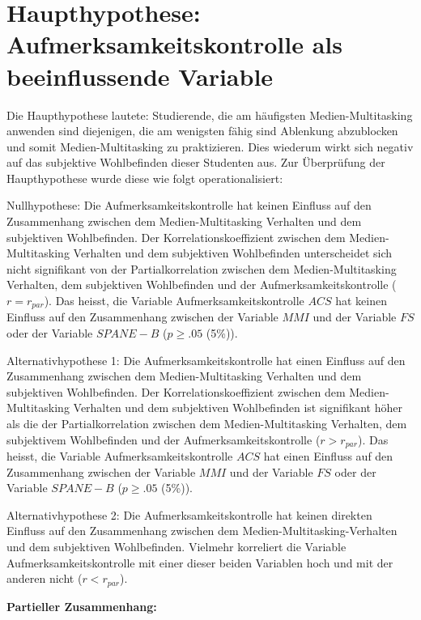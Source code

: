 \section{Haupthypothese: Aufmerksamkeitskontrolle als beeinflussende Variable}\label{label.ergebnisse.haupthypothese}
Die Haupthypothese lautete: Studierende, die am häufigsten Medien-Multitasking anwenden sind diejenigen, die am wenigsten fähig sind Ablenkung abzublocken und somit Medien-Multitasking zu praktizieren. Dies wiederum wirkt sich negativ auf das subjektive Wohlbefinden dieser Studenten aus. Zur Überprüfung der Haupthypothese wurde diese wie folgt operationalisiert:
\par
Nullhypothese: Die Aufmerksamkeitskontrolle hat keinen Einfluss auf den Zusammenhang zwischen dem Medien-Multitasking Verhalten und dem subjektiven Wohlbefinden. Der Korrelationskoeffizient zwischen dem Medien-Multitasking Verhalten und dem subjektiven Wohlbefinden unterscheidet sich nicht signifikant von der Partialkorrelation zwischen dem Medien-Multitasking Verhalten, dem subjektiven Wohlbefinden und der Aufmerksamkeitskontrolle ($r=r_{par}$). Das heisst, die Variable Aufmerksamkeitskontrolle $ACS$ hat keinen Einfluss auf den Zusammenhang zwischen der Variable $MMI$ und der Variable $FS$ oder der Variable $SPANE-B$ ($p \geq .05$ (5\%)). 
\par
Alternativhypothese 1: Die Aufmerksamkeitskontrolle hat einen Einfluss auf den Zusammenhang zwischen dem Medien-Multitasking Verhalten und dem subjektiven Wohlbefinden. Der Korrelationskoeffizient zwischen dem Medien-Multitasking Verhalten und dem subjektiven Wohlbefinden ist signifikant höher als die der Partialkorrelation zwischen dem Medien-Multitasking Verhalten, dem subjektivem Wohlbefinden und der Aufmerksamkeitskontrolle ($r>r_{par}$). Das heisst, die Variable Aufmerksamkeitskontrolle $ACS$ hat einen Einfluss auf den Zusammenhang zwischen der Variable $MMI$ und der Variable $FS$ oder der Variable $SPANE-B$ ($p \geq .05$ (5\%)). 
\par
Alternativhypothese 2: Die Aufmerksamkeitskontrolle hat keinen direkten Einfluss auf den Zusammenhang zwischen dem Medien-Multitasking-Verhalten und dem subjektiven Wohlbefinden. 
Vielmehr korreliert die Variable Aufmerksamkeitskontrolle mit einer dieser beiden Variablen hoch und mit der anderen nicht ($r<r_{par}$). 
\par
\textbf{Partieller Zusammenhang:}
